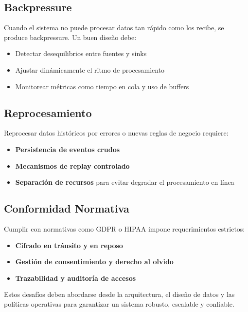 \subsection{Backpressure}
Cuando el sistema no puede procesar datos tan rápido como los recibe, se produce backpressure. Un buen diseño debe:
\begin{itemize}
    \item Detectar desequilibrios entre fuentes y sinks
    \item Ajustar dinámicamente el ritmo de procesamiento
    \item Monitorear métricas como tiempo en cola y uso de buffers
\end{itemize}

\subsection{Reprocesamiento}
Reprocesar datos históricos por errores o nuevas reglas de negocio requiere:
\begin{itemize}
    \item \textbf{Persistencia de eventos crudos}
    \item \textbf{Mecanismos de replay controlado}
    \item \textbf{Separación de recursos} para evitar degradar el procesamiento en línea
\end{itemize}

\subsection{Conformidad Normativa}
Cumplir con normativas como GDPR o HIPAA impone requerimientos estrictos:
\begin{itemize}
    \item \textbf{Cifrado en tránsito y en reposo}
    \item \textbf{Gestión de consentimiento y derecho al olvido}
    \item \textbf{Trazabilidad y auditoría de accesos}
\end{itemize}

\medskip
Estos desafíos deben abordarse desde la arquitectura, el diseño de datos y las políticas operativas para garantizar un sistema robusto, escalable y confiable.